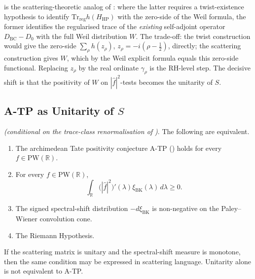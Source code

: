 \begin{remark}
\label{v4-arith:w7-j:rem:identification-buys}
 is the scattering-theoretic
analog of : where the latter
requires a twist-existence hypothesis to identify
\(\mathrm{Tr}_{\mathrm{reg}}h(H_{\mathrm{HP}})\) with the zero-side of
the Weil formula, the former identifies the regularised trace of the
\emph{existing} self-adjoint operator \(D_{\mathrm{BC}}-D_{0}\) with
the full Weil distribution \(W\). The trade-off: the twist construction
would give the zero-side
\(\sum_{\rho}h(z_{\rho})\), \(z_{\rho}=-i(\rho-\tfrac12)\), directly;
the scattering construction gives \(W\), which by the Weil explicit
formula equals this zero-side functional. Replacing \(z_{\rho}\) by
the real ordinate \(\gamma_{\rho}\) is the RH-level step. The
decisive shift is
that the positivity of \(W\) on \(|\widehat{f}|^{2}\)-tests becomes the
unitarity of \(S\).
\end{remark}

\subsection{A-TP as Unitarity of \(S\)}
\label{v4-arith:w7-j:reformulation:ATP-unitarity}

\begin{theorem}
\label{v4-arith:w7-j:thm:ATP-iff-S-unitary}
\ClaimStatusProvedHereConditional \emph{(conditional on the trace-class
renormalisation of )}. The
following are equivalent.
\begin{enumerate}
\item The archimedean Tate positivity conjecture A-TP
() holds for
every \(f\in\mathrm{PW}(\mathbb{R})\).
\item For every \(f\in\mathrm{PW}(\mathbb{R})\),
\[
\int_{\mathbb{R}}\bigl(|\widehat f|^{2}\bigr)'(\lambda)
\xi_{\mathrm{BK}}(\lambda)\,d\lambda\geq0 .
\]
\item The signed spectral-shift distribution \(-d\xi_{\mathrm{BK}}\) is
non-negative on the Paley--Wiener convolution cone.
\item The Riemann Hypothesis.
\end{enumerate}
If the scattering matrix is unitary and the spectral-shift measure is
monotone, then the same condition may be expressed in scattering
language. Unitarity alone is not equivalent to A-TP.
\end{theorem}

